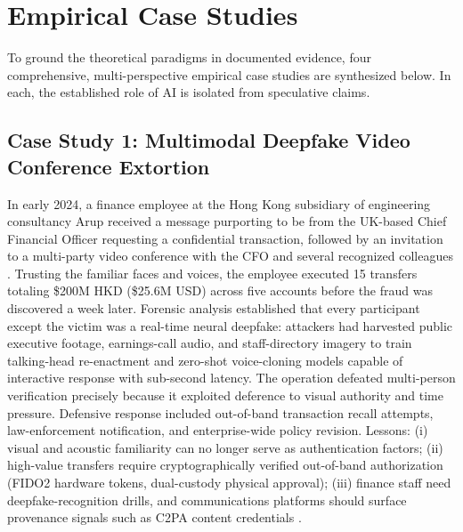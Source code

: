 \documentclass[conference,10pt,twocolumn,a4paper]{IEEEtran}
\begin{document}
\section{Empirical Case Studies}
\label{sec:casestudies}
To ground the theoretical paradigms in documented evidence, four comprehensive, multi-perspective empirical case studies are synthesized below. In each, the established role of AI is isolated from speculative claims.

\subsection{Case Study 1: Multimodal Deepfake Video Conference Extortion}
In early 2024, a finance employee at the Hong Kong subsidiary of engineering consultancy Arup received a message purporting to be from the UK-based Chief Financial Officer requesting a confidential transaction, followed by an invitation to a multi-party video conference with the CFO and several recognized colleagues \cite{hkpf_deepfake_case_2024}. Trusting the familiar faces and voices, the employee executed 15 transfers totaling \$200M HKD (\$25.6M USD) across five accounts before the fraud was discovered a week later. Forensic analysis established that every participant except the victim was a real-time neural deepfake: attackers had harvested public executive footage, earnings-call audio, and staff-directory imagery to train talking-head re-enactment and zero-shot voice-cloning models capable of interactive response with sub-second latency. The operation defeated multi-person verification precisely because it exploited deference to visual authority and time pressure. Defensive response included out-of-band transaction recall attempts, law-enforcement notification, and enterprise-wide policy revision. Lessons: (i) visual and acoustic familiarity can no longer serve as authentication factors; (ii) high-value transfers require cryptographically verified out-of-band authorization (FIDO2 hardware tokens, dual-custody physical approval); (iii) finance staff need deepfake-recognition drills, and communications platforms should surface provenance signals such as C2PA content credentials \cite{hkpf_deepfake_case_2024, fbi_deepfakes_bec_2025}.
\end{document}
